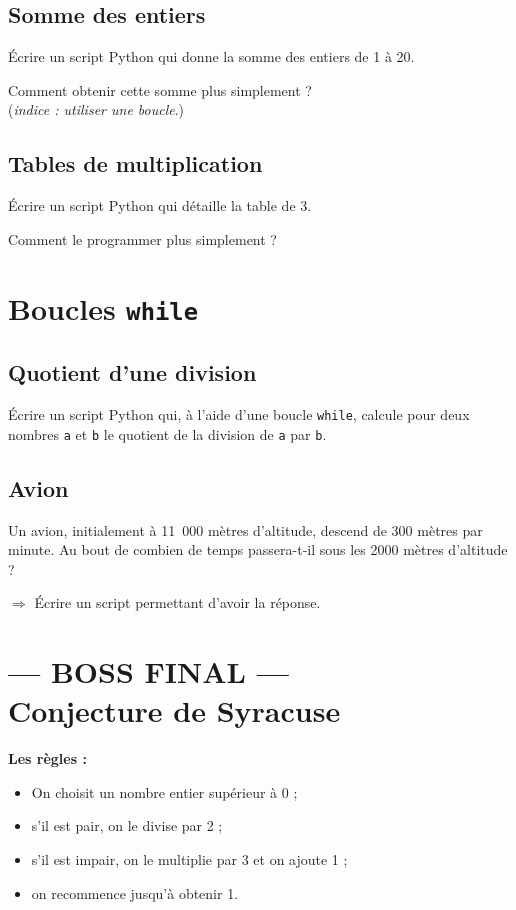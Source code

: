 \documentclass[12pt,a4paper, oneside]{article}
\begin{document}
    \subsection{Somme des entiers}\label{subsec:somme-des-entiers}
    Écrire un script Python qui donne la somme des entiers de 1 à 20.

    Comment obtenir cette somme plus simplement ? \\ (\textit{indice : utiliser une boucle}.)

    \subsection{Tables de multiplication}\label{subsec:tables-de-multiplication}
      Écrire un script Python qui détaille la table de 3.

      Comment le programmer plus simplement ?

  \section{Boucles \texttt{while}}\label{sec:boucles-while}
    \subsection{Quotient d'une division}\label{subsec:quotient-d'une-division}
      Écrire un script Python qui, à l'aide d'une boucle \texttt{while}, calcule pour deux nombres \texttt{a} et \texttt{b} le quotient de la division de \texttt{a} par \texttt{b}.

    \subsection{Avion}\label{subsec:avion}
      Un avion, initialement à 11\, 000 mètres d'altitude, descend de 300 mètres par minute.
    Au bout de combien de temps passera-t-il sous les 2000 mètres d'altitude ?

    $\Longrightarrow$ Écrire un script permettant d'avoir la réponse.

\section*{--- BOSS FINAL --- \\ Conjecture de Syracuse}
  \textbf{Les règles :}
  \begin{itemize}
    \item On choisit un nombre entier supérieur à 0 ;
    \item s'il est pair, on le divise par 2 ;
    \item s'il est impair, on le multiplie par 3 et on ajoute 1 ;
    \item on recommence jusqu'à obtenir 1.
  \end{itemize}
\end{document}
